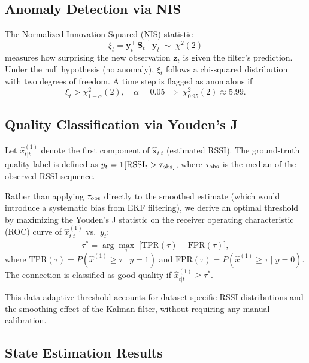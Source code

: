 \documentclass[12pt,a4paper]{article}
\begin{document}
\subsection{Anomaly Detection via NIS}

The Normalized Innovation Squared (NIS) statistic
\begin{equation}
\xi_t = \mathbf{y}_t^\top\,\mathbf{S}_t^{-1}\,\mathbf{y}_t
\;\sim\;\chi^2(2)
\label{eq:nis}
\end{equation}
measures how surprising the new observation $\mathbf{z}_t$ is given the
filter's prediction. Under the null hypothesis (no anomaly), $\xi_t$
follows a chi-squared distribution with two degrees of freedom. A time
step is flagged as anomalous if
\begin{equation}
\xi_t > \chi^2_{1-\alpha}(2),\quad \alpha = 0.05
\;\Rightarrow\; \chi^2_{0.95}(2) \approx 5.99.
\label{eq:anomaly_flag}
\end{equation}

\subsection{Quality Classification via Youden's J}

Let $\hat{x}^{(1)}_{t|t}$ denote the first component of $\hat{\mathbf{x}}_{t|t}$
(estimated RSSI). The ground-truth quality label is defined as
$y_t = \mathbf{1}[{\rm RSSI}_t > \tau_{\rm obs}]$, where $\tau_{\rm obs}$
is the median of the observed RSSI sequence.

Rather than applying $\tau_{\rm obs}$ directly to the smoothed estimate
(which would introduce a systematic bias from EKF filtering), we derive
an optimal threshold by maximizing the Youden's J statistic on the
receiver operating characteristic (ROC) curve of
$\hat{x}^{(1)}_{t|t}$ vs.\ $y_t$:
\begin{equation}
\tau^* = \arg\max_{\tau}\;\bigl[\mathrm{TPR}(\tau) - \mathrm{FPR}(\tau)\bigr],
\label{eq:youden}
\end{equation}
where $\mathrm{TPR}(\tau) = P(\hat{x}^{(1)} \geq \tau \mid y=1)$ and
$\mathrm{FPR}(\tau) = P(\hat{x}^{(1)} \geq \tau \mid y=0)$. The
connection is classified as good quality if
$\hat{x}^{(1)}_{t|t} \geq \tau^*$.

This data-adaptive threshold accounts for dataset-specific RSSI
distributions and the smoothing effect of the Kalman filter, without
requiring any manual calibration.

\subsection{State Estimation Results}
\end{document}
